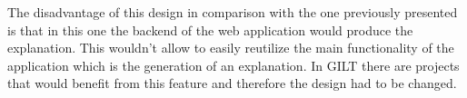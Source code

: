 The disadvantage of this design in comparison with the one previously presented is that in this one the backend of the web application would produce the explanation.
This wouldn't allow to easily reutilize the main functionality of the application which is the generation of an explanation.
In GILT there are projects that would benefit from this feature and therefore the design had to be changed.